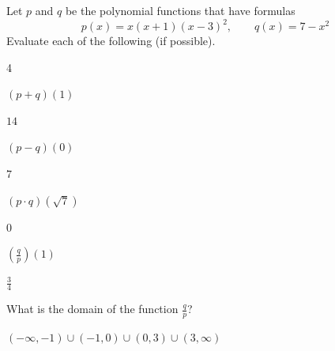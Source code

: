 \begin{exercises}
	 \begin{problem}
	 Let $p$ and $q$ be the polynomial functions that have formulas
	 \[
		 p(x)=x(x+1)(x-3)^2, \qquad q(x)=7-x^2
	 \]
	 Evaluate each of the following (if possible).
	 \begin{multicols}{4}
		 \begin{subproblem}
			 $(p+q)(1)$
			 \begin{shortsolution}
				 $14$
			 \end{shortsolution}
		 \end{subproblem}
		 \begin{subproblem}
			 $(p-q)(0)$
			 \begin{shortsolution}
				 $7$
			 \end{shortsolution}
		 \end{subproblem}
		 \begin{subproblem}
			 $(p\cdot q)(\sqrt{7})$
			 \begin{shortsolution}
				 $0$
			 \end{shortsolution}
		 \end{subproblem}
		 \begin{subproblem}
			 $\left( \frac{q}{p} \right)(1)$
			 \begin{shortsolution}
				 $\frac{3}{4}$
			 \end{shortsolution}
		 \end{subproblem}
	 \end{multicols}
	 \begin{subproblem}
		 What is the domain of the function $\frac{q}{p}$?
		 \begin{shortsolution}
			 $(-\infty,-1)\cup (-1,0)\cup (0,3)\cup (3,\infty)$
		 \end{shortsolution}
	 \end{subproblem}
	 \end{problem}


\end{exercises}
